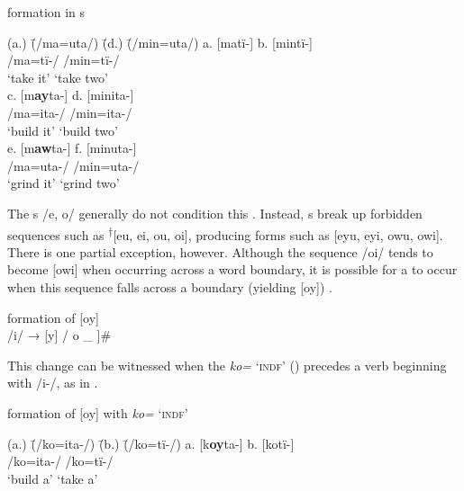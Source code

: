 \ea%
    \label{ex:phon:62}
           formation in  s\\
\begin{tabbing}    
{(a.)} \= {(/ma=uta/)} \= {(d.)} \= {(/min=uta/)}\kill
 {a.} \> {[matï-]} \> {b.} \> {[mintï-]}\\
 { } \> {/ma=tï-/} \> { } \> {/min=tï-/}\\
 { } \> {‘take it'} \> { } \> {‘take two’}\\
 {c.} \> {[m\textbf{ay}ta-]} \> {d.} \> {[minita-]}\\
 { } \> {/ma=ita-/} \> { } \> {/min=ita-/}\\
 { } \> {‘build it’} \> { } \> {‘build two’}\\
{e.} \> {[m\textbf{aw}ta-]} \> {f.} \> {[minuta-]}\\
 { } \> {/ma=uta-/} \> { } \> {/min=uta-/}\\
 { } \> {‘grind it’} \> { } \> {‘grind two’}
   \end{tabbing}
 \z

The s /e, o/ generally do not condition this . Instead,  s break up forbidden  sequences such as \textsuperscript{†}[eu, ei, ou, oi], producing forms such as [eyu, eyi, owu, owi]. There is one partial exception, however. Although the  sequence /oi/ tends to become [owi] when occurring across a word boundary, it is possible for a  to occur when this sequence falls across a  boundary (yielding [oy]) .

\ea%
    \label{ex:phon:63}
           formation of [oy]\\
    /i/ → [y] / o \_ ]\#
\z

This change can be witnessed when the    \textit{ko=} ‘\textsc{indf}’ () precedes a verb beginning with /i-/, as in .

\ea%
    \label{ex:phon:64}
           formation of [oy] with \textit{ko=} ‘\textsc{indf}’\\
\begin{tabbing}    
{(a.)} \= {(/ko=ita-/)} \= {(b.)} \= {(/ko=tï-/)}\kill
 {a.} \> {[k\textbf{oy}ta-]} \> {b.} \> {[kotï-]}\\
 { } \> {/ko=ita-/} \> { } \> {/ko=tï-/}\\
 { } \> {‘build a’} \> { } \> {‘take a’}
   \end{tabbing}
\z

